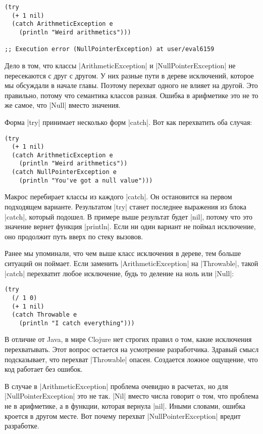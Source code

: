 \begin{verbatim}
(try
  (+ 1 nil)
  (catch ArithmeticException e
    (println "Weird arithmetics")))

;; Execution error (NullPointerException) at user/eval6159
\end{verbatim}

Дело в том, что классы \spverb|ArithmeticException| и \spverb|NullPointerException| не
пересекаются с друг с другом. У них разные пути в дереве исключений, которое мы
обсуждали в начале главы. Поэтому перехват одного не влияет на другой. Это
правильно, потому что семантика классов разная. Ошибка в арифметике это не то же
самое, что \spverb|Null| вместо значения.

Форма \spverb|try| принимает несколько форм \spverb|catch|. Вот как перехватить оба случая:

\begin{verbatim}
(try
  (+ 1 nil)
  (catch ArithmeticException e
    (println "Weird arithmetics"))
  (catch NullPointerException e
    (println "You've got a null value")))
\end{verbatim}

Макрос перебирает классы из каждого \spverb|catch|. Он остановится на первом подходящем
варианте. Результатом \spverb|try| станет последнее выражения из блока \spverb|catch|, который
подошел. В примере выше результат будет \spverb|nil|, потому что это значение вернет
функция \spverb|println|. Если ни один вариант не поймал исключение, оно продолжит путь
вверх по стеку вызовов.

Ранее мы упоминали, что чем выше класс исключения в дереве, тем больше ситуаций
он поймает. Если заменить \spverb|ArithmeticException| на \spverb|Throwable|, такой \spverb|catch|
перехватит любое исключение, будь то деление на ноль или \spverb|Null|:

\begin{verbatim}
(try
  (/ 1 0)
  (+ 1 nil)
  (catch Throwable e
    (println "I catch everything")))
\end{verbatim}

В отличие от Java, в мире Clojure нет строгих правил о том, какие исключения
перехватывать. Этот вопрос остается на усмотрение разработчика. Здравый смысл
подсказывает, что перехват \spverb|Throwable| опасен. Создается ложное ощущение, что
код работает без ошибок.

В случае в \spverb|ArithmeticException| проблема очевидно в расчетах, но для
\spverb|NullPointerException| это не так. \spverb|Nil| вместо числа говорит о том, что
проблема не в арифметике, а в функции, которая вернула \spverb|nil|. Иными словами,
ошибка кроется в другом месте. Вот почему перехват \spverb|NullPointerException| вредит
разработке.

